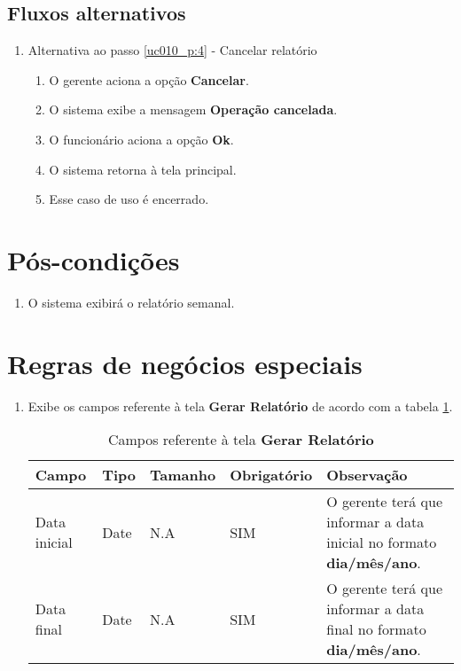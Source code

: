 \subsection{Fluxos alternativos}

\begin{enumerate}[label=A\arabic*]	
	\item Alternativa ao passo \ref{uc010_p:4} - Cancelar relatório \label{uc010_a:1}
	\begin{enumerate}[label*=.\arabic*]
		\item O gerente aciona a opção \textbf{Cancelar}.
		\item O sistema exibe a mensagem \textbf{Operação cancelada}.
		\item O funcionário aciona a opção \textbf{Ok}.
		\item O sistema retorna à tela principal.
		\item Esse caso de uso é encerrado.
	\end{enumerate}			 	
\end{enumerate}

\section{Pós-condições}

\begin{enumerate}
	\item O sistema exibirá o relatório semanal.	
\end{enumerate}

\section{Regras de negócios especiais}

\begin{enumerate}[label=RN\arabic*]
	\item Exibe os campos referente à tela \textbf{Gerar Relatório} de acordo com a tabela \ref{uc010_tb_rn1}. \label{uc010_rn:1}
	\begin{table}[htb]
		\ABNTEXfontereduzida
		\caption[Campos referente à tela \textbf{Gerar Relatório}]{Campos referente à tela \textbf{Gerar Relatório}}
		\label{uc010_tb_rn1}
		\begin{tabular}{|p{3.0cm}|p{2.0cm}|p{1.5cm}|p{2.0cm}|p{5.75cm}|}
			\hline
			\textbf{Campo} & \textbf{Tipo} & \textbf{Tamanho} & \textbf{Obrigatório} & \textbf{Observação}                                                         \\ \hline
			Data inicial   & Date          & N.A              & SIM                  & O gerente terá que informar a data inicial no formato \textbf{dia/mês/ano}. \\ \hline
			Data final     & Date          & N.A              & SIM                  & O gerente terá que informar a data final no formato \textbf{dia/mês/ano}.   \\ \hline
		\end{tabular}
	\end{table}
\end{enumerate}